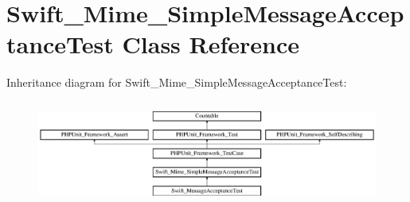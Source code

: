 \section{Swift\+\_\+\+Mime\+\_\+\+Simple\+Message\+Acceptance\+Test Class Reference}
\label{class_swift___mime___simple_message_acceptance_test}
Inheritance diagram for Swift\+\_\+\+Mime\+\_\+\+Simple\+Message\+Acceptance\+Test\+:\begin{figure}[H]
\begin{center}
\leavevmode
\includegraphics[height=3.456790cm]{class_swift___mime___simple_message_acceptance_test}
\end{center}
\end{figure}
